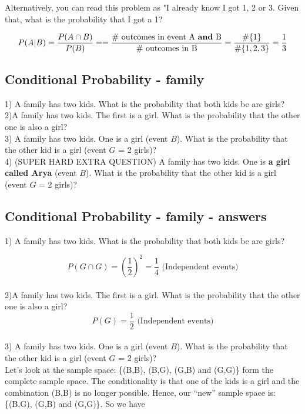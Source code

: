\documentclass[11pt]{article}
\begin{document}
	Alternatively, 	you can read this problem as "I already know I got 1, 2 or 3. Given that, what is the probability that I got a 1?

	
	\[P(A|B) = \frac{P(A\cap B)}{P(B)} = 		=\frac{\text{\# outcomes in event A \textbf{and} B}}
							{\text{\# outcomes in B}
							} = 
							\frac{\#\{1\}}{\#\{1,2,3\}}= 
							\frac{1}{3}\] 	 


	\subsection*{Conditional Probability - family}
	1) A family has two kids. What is the probability that both kids be are girls?\\
	
	2)A family has two kids. The first is a girl. What is the probability that the other one is also a girl?\\
	
	3) A family has two kids. One is a girl (event $B$). What is the probability that the other kid is a girl (event $G$ = 2 girls)?\\

	4) (SUPER HARD EXTRA QUESTION) A family has two kids. One is \textbf{a girl called Arya} (event $B$). What is the probability that the other kid is a girl (event $G$ = 2 girls)?


	\subsection*{Conditional Probability - family - answers}
	1) A family has two kids. What is the probability that both kids be are girls?

	\[P(G \cap G) = \left(\frac{1}{2}\right)^2 = \frac{1}{4} \text{ (Independent events)}\]\\
	
	2)A family has two kids. The first is a girl. What is the probability that the other one is also a girl?\\

	\[P(G) = \frac{1}{2}\text{ (Independent events)}\]\\

	3) A family has two kids. One is a girl (event $B$). What is the probability that the other kid is a girl (event $G$ = 2 girls)?\\
	
	Let's look at the sample space: \{(B,B), (B,G), (G,B) and (G,G)\} form the complete sample space. The conditionality is that one of the kids is a girl and the combination (B,B) is no longer possible. Hence, our ``new'' sample space is: \{(B,G), (G,B) and (G,G)\}. So we have
	
\end{document}
